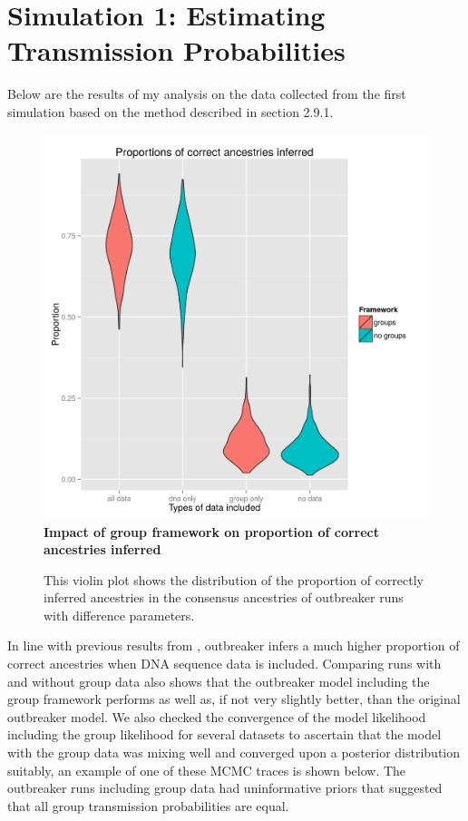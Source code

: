 \documentclass[11pt,a4paper]{report}
\begin{document}
\section{Simulation 1: Estimating Transmission Probabilities}
Below are the results of my analysis on the data collected from the first simulation based on the method described in section 2.9.1.
\begin{figure}
\centering
\includegraphics[scale=0.6]{violin_colours.png}
\newline
{\bf Impact of group framework on proportion of correct ancestries inferred}
\caption{This violin plot shows the distribution of the proportion of correctly inferred ancestries in the consensus ancestries of outbreaker runs with difference parameters.}

\end{figure}
In line with previous results from \citet{outbrkr}, outbreaker infers a much higher proportion of correct ancestries when DNA sequence data is included. Comparing runs with and without group data also shows that the outbreaker model including the group framework performs as well as, if not very slightly better, than the original outbreaker model. We also checked the convergence of the model likelihood including the group likelihood for several datasets to ascertain that the model with the group data was mixing well and converged upon a posterior distribution suitably, an example of one of these MCMC traces is shown below. The outbreaker runs including group data had uninformative priors that suggested that all group transmission probabilities are equal. 
\end{document}
